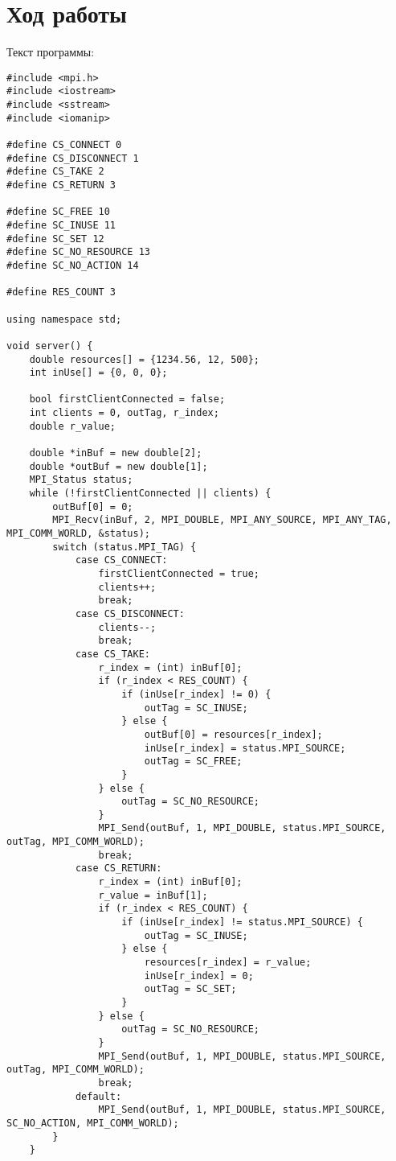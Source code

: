 \documentclass[a4paper,14pt]{extarticle}
\begin{document}
\section{Ход работы}
Текст программы:
\begin{lstlisting}
#include <mpi.h> 
#include <iostream> 
#include <sstream> 
#include <iomanip> 
  
#define CS_CONNECT 0 
#define CS_DISCONNECT 1 
#define CS_TAKE 2 
#define CS_RETURN 3 
  
#define SC_FREE 10 
#define SC_INUSE 11 
#define SC_SET 12 
#define SC_NO_RESOURCE 13 
#define SC_NO_ACTION 14 
  
#define RES_COUNT 3 
  
using namespace std; 
  
void server() { 
    double resources[] = {1234.56, 12, 500}; 
    int inUse[] = {0, 0, 0}; 
  
    bool firstClientConnected = false; 
    int clients = 0, outTag, r_index; 
    double r_value; 
  
    double *inBuf = new double[2]; 
    double *outBuf = new double[1]; 
    MPI_Status status; 
    while (!firstClientConnected || clients) { 
        outBuf[0] = 0; 
        MPI_Recv(inBuf, 2, MPI_DOUBLE, MPI_ANY_SOURCE, MPI_ANY_TAG, MPI_COMM_WORLD, &status); 
        switch (status.MPI_TAG) { 
            case CS_CONNECT: 
                firstClientConnected = true; 
                clients++; 
                break; 
            case CS_DISCONNECT: 
                clients--; 
                break; 
            case CS_TAKE: 
                r_index = (int) inBuf[0]; 
                if (r_index < RES_COUNT) { 
                    if (inUse[r_index] != 0) { 
                        outTag = SC_INUSE; 
                    } else { 
                        outBuf[0] = resources[r_index]; 
                        inUse[r_index] = status.MPI_SOURCE; 
                        outTag = SC_FREE; 
                    } 
                } else { 
                    outTag = SC_NO_RESOURCE; 
                } 
                MPI_Send(outBuf, 1, MPI_DOUBLE, status.MPI_SOURCE, outTag, MPI_COMM_WORLD); 
                break; 
            case CS_RETURN: 
                r_index = (int) inBuf[0]; 
                r_value = inBuf[1]; 
                if (r_index < RES_COUNT) { 
                    if (inUse[r_index] != status.MPI_SOURCE) { 
                        outTag = SC_INUSE; 
                    } else { 
                        resources[r_index] = r_value; 
                        inUse[r_index] = 0; 
                        outTag = SC_SET; 
                    } 
                } else { 
                    outTag = SC_NO_RESOURCE; 
                } 
                MPI_Send(outBuf, 1, MPI_DOUBLE, status.MPI_SOURCE, outTag, MPI_COMM_WORLD); 
                break; 
            default: 
                MPI_Send(outBuf, 1, MPI_DOUBLE, status.MPI_SOURCE, SC_NO_ACTION, MPI_COMM_WORLD); 
        } 
    } 
  

\end{lstlisting}
\end{document}
